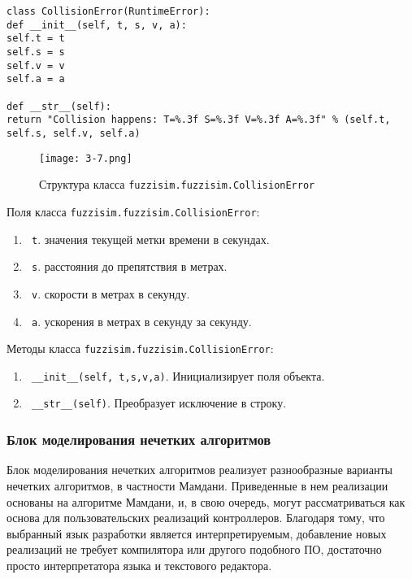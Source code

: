 \begin{lstlisting}[style=pythonstyle,caption={  }, label=lst:func:1]
class CollisionError(RuntimeError):
def __init__(self, t, s, v, a):
self.t = t
self.s = s
self.v = v
self.a = a

def __str__(self):
return "Collision happens: T=%.3f S=%.3f V=%.3f A=%.3f" % (self.t, self.s, self.v, self.a)
\end{lstlisting}

\begin{figure}[ht]
	\centering
	\texttt{[image: 3-7.png]}
	\caption{ Структура класса \lstinline!fuzzisim.fuzzisim.CollisionError!}
\end{figure}

Поля класса \lstinline!fuzzisim.fuzzisim.CollisionError!:
\begin{enumerate}[label=\arabic*)]
	\item \lstinline! t!. значения текущей метки времени в секундах.
	\item \lstinline! s!. расстояния до препятствия в метрах.
	\item \lstinline! v!. скорости в метрах в секунду.
	\item \lstinline! a!. ускорения в метрах в секунду за секунду.
\end{enumerate}


Методы класса \lstinline!fuzzisim.fuzzisim.CollisionError!:
\begin{enumerate}[label=\arabic*)]
	\item \lstinline! __init__(self, t,s,v,a)!. Инициализирует поля объекта.
	\item \lstinline! __str__(self)!.  Преобразует исключение в строку.
\end{enumerate}



\subsubsection{ Блок моделирования нечетких алгоритмов }

Блок моделирования нечетких алгоритмов реализует разнообразные варианты нечетких алгоритмов, в частности Мамдани. Приведенные в нем реализации основаны на алгоритме Мамдани, и, в свою очередь, могут рассматриваться как основа для пользовательских реализаций контроллеров. Благодаря тому, что выбранный язык разработки является интерпретируемым, добавление новых реализаций не требует компилятора или другого подобного ПО, достаточно просто интерпретатора языка и текстового редактора.

